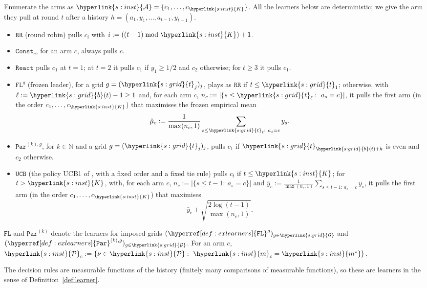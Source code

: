\documentclass[11pt]{article}
\newcommand{\dt}[1]{\hypertarget{#1}{}}
\newcommand{\sy}[2]{{\hyperlink{#1}{#2}}}
\newcommand{\1}{\mathbf{1}}
\newcommand{\Nat}{\mathbb{N}}
\newcommand{\Arms}{\sy{s:inst}{\mathcal A}}
\newcommand{\Kar}{\sy{s:inst}{K}}
\newcommand{\mean}{\sy{s:inst}{m}}
\newcommand{\ms}{\sy{s:inst}{m^\star}}
\newcommand{\cP}{\sy{s:inst}{\mathcal P}}
\newcommand{\Gr}{\sy{s:grid}{\mathcal G}}
\newcommand{\tl}{\sy{s:grid}{t}}
\newcommand{\bt}{\sy{s:grid}{b}}
\newcommand{\RR}{\hyperref[def:exlearners]{\texttt{RR}}}
\newcommand{\Const}{\hyperref[def:exlearners]{\texttt{Const}}}
\newcommand{\FL}{\hyperref[def:exlearners]{\texttt{FL}}}
\newcommand{\React}{\hyperref[def:exlearners]{\texttt{React}}}
\newcommand{\Par}{\hyperref[def:exlearners]{\texttt{Par}}}
\newcommand{\UCB}{\hyperref[def:exlearners]{\texttt{UCB}}}
\begin{document}
\begin{definition}\label{def:exlearners}
\dt{s:exlearn}Enumerate the arms as $\Arms=\{c_1,\dots,c_{\Kar}\}$. All the learners below are
deterministic; we give the arm they pull at round $t$ after a history
$h=(a_1,y_1,\dots,a_{t-1},y_{t-1})$.
\begin{itemize}
\item $\RR$ (round robin) pulls $c_i$ with $i:=((t-1)\bmod\Kar)+1$.
\item $\Const_c$, for an arm $c$, always pulls $c$.
\item $\React$ pulls $c_1$ at $t=1$; at $t=2$ it pulls $c_1$ if $y_1\ge1/2$ and $c_2$ otherwise;
  for $t\ge3$ it pulls $c_1$.
\item $\FL^g$ (frozen leader), for a grid $g=(\tl_j)_j$, plays as $\RR$ if $t\le\tl_1$; otherwise,
  with $\ell:=\bt(t)-1\ge1$ and, for each arm $c$, $n_c:=|\{s\le\tl_\ell:\ a_s=c\}|$, it pulls the
  first arm (in the order $c_1,\dots,c_{\Kar}$) that maximises the frozen empirical mean
  \begin{equation*}
    \hat\mu_c:=\frac1{\max(n_c,1)}\sum_{s\le\tl_\ell:\ a_s=c}y_s .
  \end{equation*}
\item $\Par^{(k),g}$, for $k\in\Nat$ and a grid $g=(\tl_j)_j$, pulls $c_1$ if $\tl_{\bt(t)+k}$ is
  even and $c_2$ otherwise.
\item $\UCB$ (the policy UCB1 of \citet{ACF02}, with a fixed order and a fixed tie rule) pulls $c_t$
  if $t\le\Kar$; for $t>\Kar$, with, for each arm $c$, $n_c:=|\{s\le t-1:\ a_s=c\}|$ and
  $\bar y_c:=\frac1{\max(n_c,1)}\sum_{s\le t-1:\ a_s=c}y_s$, it pulls the first arm (in the order
  $c_1,\dots,c_{\Kar}$) that maximises
  \begin{equation*}
    \bar y_c+\sqrt{\frac{2\log(t-1)}{\max(n_c,1)}} .
  \end{equation*}
\end{itemize}
$\FL$ and $\Par^{(k)}$ denote the learners for imposed grids $(\FL^g)_{g\in\Gr}$ and
$(\Par^{(k),g})_{g\in\Gr}$. For an arm $c$, $\cP_c:=\{\nu\in\cP:\ \mean_c=\ms\}$.
\end{definition}

The decision rules are measurable functions of the history (finitely many comparisons of
measurable functions), so these are learners in the sense of Definition~\ref{def:learner}.
\end{document}
